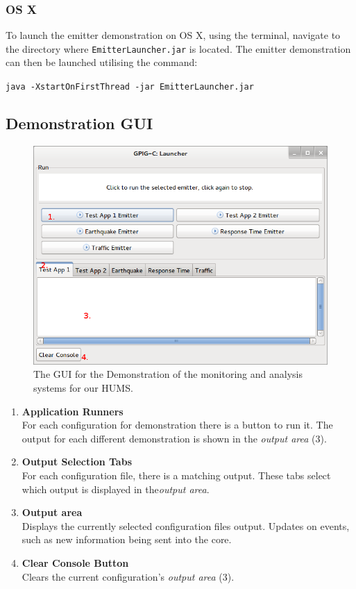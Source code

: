 \documentclass[10pt,a4paper]{article}
\begin{document}
\subsubsection{OS X}
To launch the emitter demonstration on OS X, using the terminal, navigate to the directory where \texttt{EmitterLauncher.jar} is located. The emitter demonstration can then be launched utilising the command:
\begin{center}
\texttt{java -XstartOnFirstThread -jar EmitterLauncher.jar}
\end{center}

\subsection{Demonstration GUI}
\begin{figure}[H]
  \centering
  \includegraphics[width=\textwidth]{images/demo-gui.png}
  \caption{The GUI for the Demonstration of the monitoring and analysis systems for our HUMS.}
  \label{fig:demogui}
\end{figure}
\begin{enumerate}
\item \textbf{Application Runners} \\ For each configuration for demonstration there is a button to run it. The output for each different demonstration is shown in the \emph{output area} ($3$).
\item \textbf{Output Selection Tabs} \\ For each configuration file, there is a matching output. These tabs select which output is displayed in the\emph{output area}.
\item \textbf{Output area} \\ Displays the currently selected configuration files output. Updates on events, such as new information being sent into the core.
\item \textbf{Clear Console Button} \\ 
Clears the current configuration's \emph{output area} ($3$).
\end{enumerate}
\end{document}

